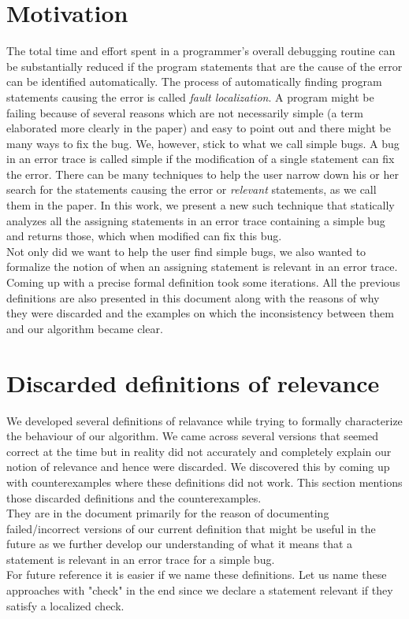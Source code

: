 \documentclass{article}
\begin{document}
\section{Motivation}
The total time and effort spent in a programmer's overall debugging routine can be substantially reduced if the program statements that are the cause of the error can be identified automatically. The process of automatically finding program statements causing the error is called \textit{fault localization}. A program might be failing because of several reasons which are not necessarily simple (a term elaborated more clearly in the paper) and easy to point out and there might be many ways to fix the bug. We, however, stick to what we call simple bugs. A bug in an error trace is called simple if the modification of a single statement can fix the error. There can be many techniques to help the user narrow down his or her search for the statements  causing the error or \textit{relevant} statements, as we call them in the paper. In this work, we present a new such technique that statically analyzes all the assigning statements in an error trace containing a simple bug and returns those, which when modified can fix this bug.\\
Not only did we want to help the user find simple bugs, we also wanted to formalize the notion of when an assigning statement is relevant in an error trace.
Coming up with a precise formal definition took some iterations. All the previous definitions are also presented in this document along with the reasons of why they were discarded and the examples on which the inconsistency between them and our algorithm became clear.\\
\section{Discarded definitions of relevance}
We developed several definitions of relavance while trying to formally characterize the behaviour of our algorithm. We came across several versions that seemed correct at the time but in reality did not accurately and completely explain our notion of relevance and hence were discarded. We discovered this by coming up with counterexamples where these definitions did not work. This section mentions those discarded definitions and the counterexamples.\\ 
They are in the document primarily for the reason of documenting failed/incorrect versions of our current definition that might be useful in the future as we further develop our understanding of what it means that a statement is relevant in an error trace for a simple bug. \\
For future reference it is easier if we name these definitions. Let us name these approaches with "check" in the end since we declare a statement relevant if they satisfy a localized check. 
\end{document}
